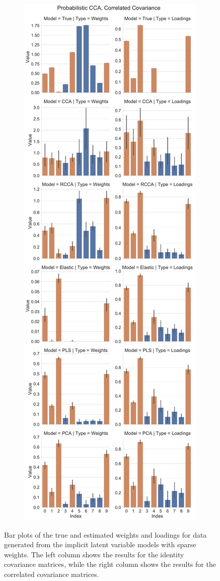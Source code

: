 \begin{figure}
\begin{subfigure}{0.49\linewidth}
\end{subfigure}
\begin{subfigure}{0.49\linewidth}
\centering
\includegraphics[width=\linewidth]{figures/simulated/explicit/Combined_Weights_Loadings_with_Error_Bars_Correlated}
\end{subfigure}
\caption{Bar plots of the true and estimated weights and \gls{loadings} for data generated from the implicit latent variable models with sparse weights. The left column shows the results for the identity covariance matrices, while the right column shows the results for the correlated covariance matrices.}\label{fig:explicit-weights-loadings}
\end{figure}

